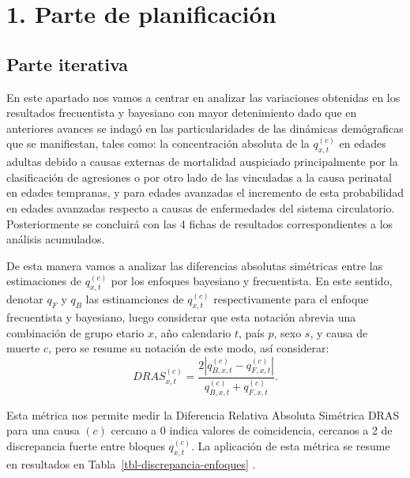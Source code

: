 \documentclass[
  spanish,
  letterpaper,
  DIV=11,
  numbers=noendperiod]{scrartcl}
\begin{document}
\section{1. Parte de planificación}\label{parte-de-planificaciuxf3n}

\subsection{Parte iterativa}\label{parte-iterativa}

En este apartado nos vamos a centrar en analizar las variaciones
obtenidas en los resultados frecuentista y bayesiano con mayor
detenimiento dado que en anteriores avances se indagó en las
particularidades de las dinámicas demógraficas que se manifiestan, tales
como: la concentración absoluta de la \(q_{x,t}^{(c)}\) en edades
adultas debido a causas externas de mortalidad auspiciado principalmente
por la clasificación de agresiones o por otro lado de las vinculadas a
la causa perinatal en edades tempranas, y para edades avanzadas el
incremento de esta probabilidad en edades avanzadas respecto a causas de
enfermedades del sistema circulatorio. Posteriormente se concluirá con
las 4 fichas de resultados correspondientes a los análisis acumulados.

De esta manera vamos a analizar las diferencias absolutas simétricas
entre las estimaciones de \(q_{x,t}^{(c)}\) por los enfoques bayesiano y
frecuentista. En este sentido, denotar \(q_{F}\) y \(q_{B}\) las
estinamciones de \(q_{x,t}^{(c)}\) respectivamente para el enfoque
frecuentista y bayesiano, luego considerar que esta notación abrevia una
combinación de grupo etario \(x\), año calendario \(t\), país \(p\),
sexo \(s\), y causa de muerte \(c\), pero se resume su notación de este
modo, así considerar: \[DRAS_{x,t}^{(c)}
=
\frac{
2\left|
q_{B,x,t}^{(c)} - q_{F,x,t}^{(c)}
\right|
}{
q_{B,x,t}^{(c)} + q_{F,x,t}^{(c)}
}.
\]

Esta métrica nos permite medir la Diferencia Relativa Absoluta Simétrica
DRAS para una causa \((c)\) cercano a 0 indica valores de coincidencia,
cercanos a 2 de discrepancia fuerte entre bloques \(q_{x,t}^{(c)}\). La
aplicación de esta métrica se resume en resultados en
Tabla~\ref{tbl-discrepancia-enfoques} .
\end{document}
